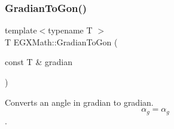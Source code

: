 \mbox{\label{group___e_g_x_math-_angle_conversions-_gradian_gaff399262b6c8455e450e0a9dc8eb2ad1}} 
\subsubsection{\texorpdfstring{Gradian\+To\+Gon()}{GradianToGon()}}
{\footnotesize\ttfamily template$<$typename T $>$ \\
T E\+G\+X\+Math\+::\+Gradian\+To\+Gon (\begin{DoxyParamCaption}\item[{const T \&}]{gradian }\end{DoxyParamCaption})}



Converts an angle in gradian to gradian. \[\alpha_{g}=\alpha_{g}\]. 

